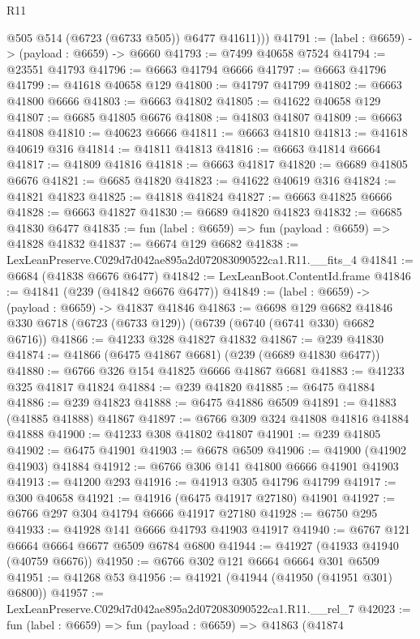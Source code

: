 \begin{lexlean}{R11}
\begin{coremodule}
          @505
          @514
          (@6723 (@6733 @505))
          @6477
          @41611)))
@41791 := (label : @6659) -> (payload : @6659) -> @6660
@41793 := @7499 @40658 @7524
@41794 := @23551 @41793
@41796 := @6663 @41794 @6666
@41797 := @6663 @41796
@41799 := @41618 @40658 @129
@41800 := @41797 @41799
@41802 := @6663 @41800 @6666
@41803 := @6663 @41802
@41805 := @41622 @40658 @129
@41807 := @6685 @41805 @6676
@41808 := @41803 @41807
@41809 := @6663 @41808
@41810 := @40623 @6666
@41811 := @6663 @41810
@41813 := @41618 @40619 @316
@41814 := @41811 @41813
@41816 := @6663 @41814 @6664
@41817 := @41809 @41816
@41818 := @6663 @41817
@41820 := @6689 @41805 @6676
@41821 := @6685 @41820
@41823 := @41622 @40619 @316
@41824 := @41821 @41823
@41825 := @41818 @41824
@41827 := @6663 @41825 @6666
@41828 := @6663 @41827
@41830 := @6689 @41820 @41823
@41832 := @6685 @41830 @6477
@41835 := fun (label : @6659) => fun (payload : @6659) => @41828 @41832
@41837 := @6674 @129 @6682
@41838 := LexLeanPreserve.C029d7d042ae895a2d072083090522ca1.R11.__fits_4
@41841 := @6684 (@41838 @6676 @6477)
@41842 := LexLeanBoot.ContentId.frame
@41846 := @41841 (@239 (@41842 @6676 @6477))
@41849 := (label : @6659) -> (payload : @6659) -> @41837 @41846
@41863 := @6698
    @129
    @6682
    @41846
    @330
    @6718
    (@6723 (@6733 @129))
    (@6739 (@6740 (@6741 @330) @6682 @6716))
@41866 := @41233 @328 @41827 @41832
@41867 := @239 @41830
@41874 := @41866 (@6475 @41867 @6681) (@239 (@6689 @41830 @6477))
@41880 := @6766 @326 @154 @41825 @6666 @41867 @6681
@41883 := @41233 @325 @41817 @41824
@41884 := @239 @41820
@41885 := @6475 @41884
@41886 := @239 @41823
@41888 := @6475 @41886 @6509
@41891 := @41883 (@41885 @41888) @41867
@41897 := @6766 @309 @324 @41808 @41816 @41884 @41888
@41900 := @41233 @308 @41802 @41807
@41901 := @239 @41805
@41902 := @6475 @41901
@41903 := @6678 @6509
@41906 := @41900 (@41902 @41903) @41884
@41912 := @6766 @306 @141 @41800 @6666 @41901 @41903
@41913 := @41200 @293
@41916 := @41913 @305 @41796 @41799
@41917 := @300 @40658
@41921 := @41916 (@6475 @41917 @27180) @41901
@41927 := @6766 @297 @304 @41794 @6666 @41917 @27180
@41928 := @6750 @295
@41933 := @41928 @141 @6666 @41793 @41903 @41917
@41940 := @6767 @121 @6664 @6664 @6677 @6509 @6784 @6800
@41944 := @41927 (@41933 @41940 (@40759 @6676))
@41950 := @6766 @302 @121 @6664 @6664 @301 @6509
@41951 := @41268 @53
@41956 := @41921 (@41944 (@41950 (@41951 @301) @6800))
@41957 := LexLeanPreserve.C029d7d042ae895a2d072083090522ca1.R11.__rel_7
@42023 := fun (label : @6659) =>
  fun (payload : @6659) =>
  @41863
    (@41874

\end{coremodule}
\end{lexlean}
